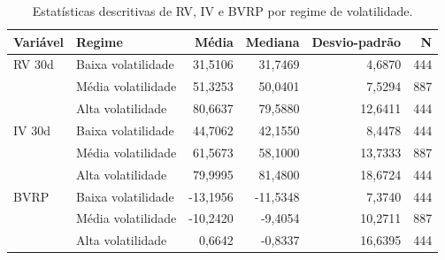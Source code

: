 \begin{table}[H]
\centering
\small
\caption{Estatísticas descritivas de RV, IV e BVRP por regime de volatilidade.}
\label{tab:retnl-estatisticas}
\begin{tabular}{llrrrr}
\toprule
Variável & Regime & Média & Mediana & Desvio-padrão & N \\
\midrule
RV 30d & Baixa volatilidade & 31,5106 & 31,7469 & 4,6870 & 444 \\
 & Média volatilidade & 51,3253 & 50,0401 & 7,5294 & 887 \\
 & Alta volatilidade & 80,6637 & 79,5880 & 12,6411 & 444 \\
\midrule
IV 30d & Baixa volatilidade & 44,7062 & 42,1550 & 8,4478 & 444 \\
 & Média volatilidade & 61,5673 & 58,1000 & 13,7333 & 887 \\
 & Alta volatilidade & 79,9995 & 81,4800 & 18,6724 & 444 \\
\midrule
BVRP & Baixa volatilidade & -13,1956 & -11,5348 & 7,3740 & 444 \\
 & Média volatilidade & -10,2420 & -9,4054 & 10,2711 & 887 \\
 & Alta volatilidade & 0,6642 & -0,8337 & 16,6395 & 444 \\
\bottomrule
\end{tabular}
\end{table}